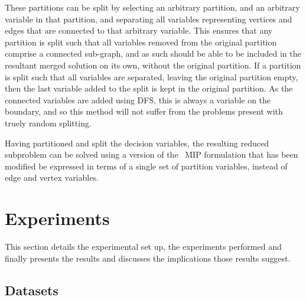 \documentclass[journal]{IEEEtran}
\begin{document}
These partitions can be split by selecting an arbitrary partition, and an arbitrary variable in that partition, and separating all variables representing vertices and edges that are connected to that arbitrary variable. This ensures that any partition is split such that all variables removed from the original partition comprise a connected sub-graph, and as such should be able to be included in the resultant merged solution on its own, without the original partition. If a partition is split such that all variables are separated, leaving the original partition empty, then the last variable added to the split is kept in the original partition. As the connected variables are added using DFS, this is always a variable on the boundary, and so this method will not suffer from the problems present with truely random splitting. 

Having partitioned and split the decision variables, the resulting reduced subproblem can be solved using a version of the~\cite{goemans} MIP formulation that has been modified be expressed in terms of a single set of partition variables, instead of edge and vertex variables.


\section{Experiments}
This section details the experimental set up, the experiments performed and finally presents the results and discusses the implications those results suggest.
\subsection{Datasets}
\end{document}

